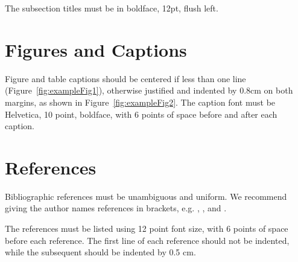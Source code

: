 \documentclass[12pt]{article}
\begin{document}
The subsection titles must be in boldface, 12pt, flush left.

\section{Figures and Captions}\label{sec:figs}


Figure and table captions should be centered if less than one line
(Figure~\ref{fig:exampleFig1}), otherwise justified and indented by 0.8cm on
both margins, as shown in Figure~\ref{fig:exampleFig2}. The caption font must
be Helvetica, 10 point, boldface, with 6 points of space before and after each
caption.


\section{References}

Bibliographic references must be unambiguous and uniform.  We recommend giving
the author names references in brackets, e.g. \cite{knuth:84},
\cite{boulic:91}, and \cite{smith:99}.

The references must be listed using 12 point font size, with 6 points of space
before each reference. The first line of each reference should not be
indented, while the subsequent should be indented by 0.5 cm.



\end{document}
